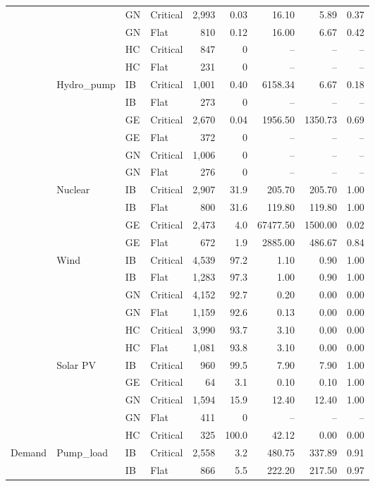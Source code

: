 \begin{longtable}{@{}l l l l r r r r r@{}}
 &  & GN & Critical & 2,993 & 0.03 & 16.10 & 5.89 & 0.37 \\
 &  & GN & Flat & 810 & 0.12 & 16.00 & 6.67 & 0.42 \\
 &  & HC & Critical & 847 & 0 & -- & -- & -- \\
 &  & HC & Flat & 231 & 0 & -- & -- & -- \\
\addlinespace
 & Hydro\_pump & IB & Critical & 1,001 & 0.40 & 6158.34 & 6.67 & 0.18 \\
 &  & IB & Flat & 273 & 0 & -- & -- & -- \\
 &  & GE & Critical & 2,670 & 0.04 & 1956.50 & 1350.73 & 0.69 \\
 &  & GE & Flat & 372 & 0 & -- & -- & -- \\
 &  & GN & Critical & 1,006 & 0 & -- & -- & -- \\
 &  & GN & Flat & 276 & 0 & -- & -- & -- \\
\addlinespace
 & Nuclear & IB & Critical & 2,907 & 31.9 & 205.70 & 205.70 & 1.00 \\
 &  & IB & Flat & 800 & 31.6 & 119.80 & 119.80 & 1.00 \\
 &  & GE & Critical & 2,473 & 4.0 & 67477.50 & 1500.00 & 0.02 \\
 &  & GE & Flat & 672 & 1.9 & 2885.00 & 486.67 & 0.84 \\
\addlinespace
 & Wind & IB & Critical & 4,539 & 97.2 & 1.10 & 0.90 & 1.00 \\
 &  & IB & Flat & 1,283 & 97.3 & 1.00 & 0.90 & 1.00 \\
 &  & GN & Critical & 4,152 & 92.7 & 0.20 & 0.00 & 0.00 \\
 &  & GN & Flat & 1,159 & 92.6 & 0.13 & 0.00 & 0.00 \\
 &  & HC & Critical & 3,990 & 93.7 & 3.10 & 0.00 & 0.00 \\
 &  & HC & Flat & 1,081 & 93.8 & 3.10 & 0.00 & 0.00 \\
\addlinespace
 & Solar PV & IB & Critical & 960 & 99.5 & 7.90 & 7.90 & 1.00 \\
 &  & GE & Critical & 64 & 3.1 & 0.10 & 0.10 & 1.00 \\
 &  & GN & Critical & 1,594 & 15.9 & 12.40 & 12.40 & 1.00 \\
 &  & GN & Flat & 411 & 0 & -- & -- & -- \\
 &  & HC & Critical & 325 & 100.0 & 42.12 & 0.00 & 0.00 \\
\midrule
Demand & Pump\_load & IB & Critical & 2,558 & 3.2 & 480.75 & 337.89 & 0.91 \\
 &  & IB & Flat & 866 & 5.5 & 222.20 & 217.50 & 0.97 \\

\end{longtable}
